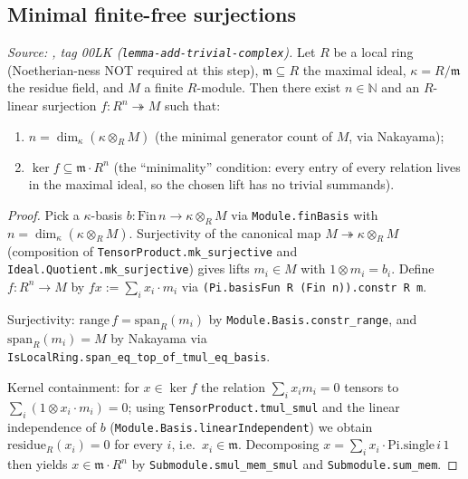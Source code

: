 \subsection{Minimal finite-free surjections}
\label{subsec:ab_gap1_first_step}
\begin{lemma}\leanok
  \label{lem:exists_minimalSurjection_finite_localRing}
  \textit{Source: \cite{stacks-project}, tag 00LK
    (\texttt{lemma-add-trivial-complex}).}
  Let \(R\) be a local ring (Noetherian-ness NOT required at this
  step), \(\mathfrak m \subseteq R\) the maximal ideal,
  \(\kappa = R/\mathfrak m\) the residue field, and \(M\) a finite
  \(R\)-module. Then there exist \(n \in \mathbb N\) and an
  \(R\)-linear surjection \(f : R^n \twoheadrightarrow M\) such that:
  \begin{enumerate}
    \item \(n = \dim_\kappa(\kappa \otimes_R M)\) (the minimal
      generator count of \(M\), via Nakayama);
    \item \(\ker f \subseteq \mathfrak m \cdot R^n\) (the
      ``minimality'' condition: every entry of every relation lives
      in the maximal ideal, so the chosen lift has no trivial
      summands).
  \end{enumerate}
\end{lemma}
\begin{proof}

\leanok
  Pick a \(\kappa\)-basis
  \(b : \mathrm{Fin}\,n \to \kappa \otimes_R M\) via
  \texttt{Module.finBasis} with
  \(n = \dim_\kappa(\kappa \otimes_R M)\). Surjectivity of the
  canonical map \(M \twoheadrightarrow \kappa \otimes_R M\)
  (composition of \texttt{TensorProduct.mk\_surjective} and
  \texttt{Ideal.Quotient.mk\_surjective}) gives lifts
  \(m_i \in M\) with \(1 \otimes m_i = b_i\). Define
  \(f : R^n \to M\) by \(f x := \sum_i x_i \cdot m_i\) via
  \texttt{(Pi.basisFun R (Fin n)).constr R m}.

  Surjectivity: \(\mathrm{range}\, f = \mathrm{span}_R(m_i)\) by
  \texttt{Module.Basis.constr\_range}, and
  \(\mathrm{span}_R(m_i) = M\) by Nakayama via
  \texttt{IsLocalRing.span\_eq\_top\_of\_tmul\_eq\_basis}.

  Kernel containment: for \(x \in \ker f\) the relation
  \(\sum_i x_i m_i = 0\) tensors to
  \(\sum_i (1 \otimes x_i \cdot m_i) = 0\); using
  \texttt{TensorProduct.tmul\_smul} and the linear independence of
  \(b\) (\texttt{Module.Basis.linearIndependent}) we obtain
  \(\mathrm{residue}_R(x_i) = 0\) for every \(i\), i.e.\
  \(x_i \in \mathfrak m\). Decomposing
  \(x = \sum_i x_i \cdot \mathrm{Pi.single}\,i\,1\) then yields
  \(x \in \mathfrak m \cdot R^n\) by
  \texttt{Submodule.smul\_mem\_smul} and
  \texttt{Submodule.sum\_mem}.
\end{proof}

